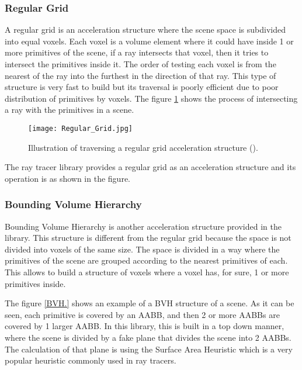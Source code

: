\subsubsection{Regular Grid}

\par
A regular grid is an acceleration structure where the scene space is subdivided into equal voxels.
Each voxel is a volume element where it could have inside 1 or more primitives of the scene, if a ray intersects that voxel, then it tries to intersect the primitives inside it.
The order of testing each voxel is from the nearest of the ray into the furthest in the direction of that ray.
This type of structure is very fast to build but its traversal is poorly efficient due to poor distribution of primitives by voxels.
The figure \ref{RegularGrid.} shows the process of intersecting a ray with the primitives in a scene.

\begin{figure}[H]
	\centering
	\caption{Illustration of traversing a regular grid acceleration structure (\cite{RegularGrid}).}
	\label{RegularGrid.}
	\texttt{[image: Regular\_Grid.jpg]}
\end{figure}

\par
The ray tracer library provides a regular grid as an acceleration structure and its operation is as shown in the figure.

\subsubsection{Bounding Volume Hierarchy}

\par
Bounding Volume Hierarchy is another acceleration structure provided in the library.
This structure is different from the regular grid because the space is not divided into voxels of the same size.
The space is divided in a way where the primitives of the scene are grouped according to the nearest primitives of each.
This allows to build a structure of voxels where a voxel has, for sure, 1 or more primitives inside.

\par
The figure \ref{BVH.} shows an example of a BVH structure of a scene.
As it can be seen, each primitive is covered by an AABB, and then 2 or more AABBs are covered by 1 larger AABB.
In this library, this is built in a top down manner, where the scene is divided by a fake plane that divides the scene into 2 AABBs.
The calculation of that plane is using the Surface Area Heuristic which is a very popular heuristic commonly used in ray tracers.


